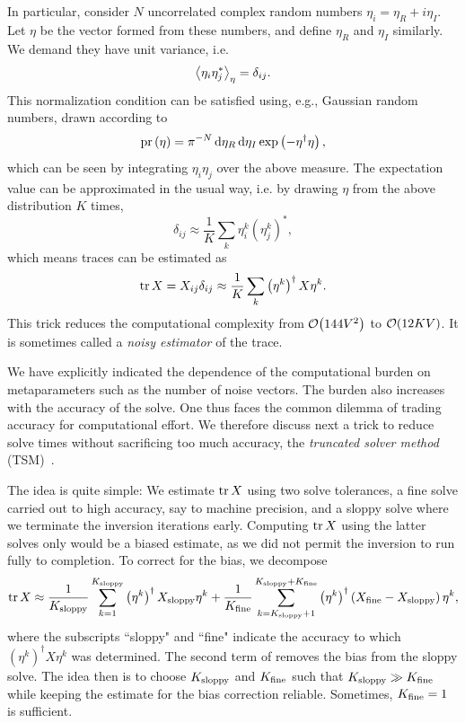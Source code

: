 In particular, consider $N$ uncorrelated complex random numbers
$\eta_i=\eta_R+i\eta_I$. Let $\eta$ be the vector formed from these numbers, and
define $\eta_R$ and $\eta_I$ similarly. We demand they have unit variance, i.e.
\begin{equation}\label{eq:noisenorm}
\ev{\eta_i\eta_j^*}_\eta = \delta_{ij}.
\end{equation}
This normalization condition can be satisfied using, e.g., Gaussian random
numbers, drawn according to
\begin{equation}
\pr{\eta}=\pi^{-N}\dd{\eta_R}\dd{\eta_I}\exp\left(-\eta^\dagger\eta\right),
\end{equation}
which can be seen by integrating $\eta_i\eta_j$ over the above measure.
The expectation value  can be approximated in the usual
way, i.e. by drawing $\eta$ from the above distribution $K$ times,
\begin{equation}
\delta_{ij}\approx\frac{1}{K}\sum_k\eta_i^{k}\left(\eta_j^{k}\right)^*,
\end{equation}
which means traces can be estimated as
\begin{equation}
\tr X= X_{ij}\delta_{ij} \approx\frac{1}{K}\sum_k\left(\eta^k\right)^\dagger X\eta^{k}.
\end{equation}
This trick reduces the computational complexity from $\order{144V^2}$ to
$\order{12KV}$. It is sometimes called a {\it noisy
estimator} of the trace. 

We have explicitly indicated the dependence of the computational burden on
metaparameters such as the number of noise vectors. The burden also increases
with the accuracy of the solve. One thus faces the common dilemma of
trading accuracy for computational effort. We therefore discuss next a trick to
reduce solve times without sacrificing too much accuracy, the {\it truncated
solver method} (TSM)~\cite{bali_effective_2010}.

The idea is quite simple: We estimate $\tr X$ using two solve tolerances, a fine
solve carried out to high accuracy, say to machine precision, and a sloppy solve
where we terminate the inversion iterations early. Computing $\tr X$ using the
latter solves only would be a biased estimate, as we did not permit the
inversion to run fully to completion. To correct for the bias, we decompose
\begin{equation}\label{eq:TSM}
\tr X\approx \frac{1}{K_{\rm sloppy}}\sum_{k=1}^{K_{\rm sloppy}}
\left(\eta^k\right)^\dagger X_{\rm sloppy}\eta^{k}
+\frac{1}{K_{\rm fine}}\sum_{k=K_{\rm sloppy}+1}^{K_{\rm sloppy}+K_{\rm fine}}
\left(\eta^k\right)^\dagger 
\left(X_{\rm fine}-X_{\rm sloppy}\right)\eta^{k},
\end{equation}
where the subscripts ``sloppy" and ``fine" indicate the accuracy to which
$\left(\eta^k\right)^\dagger X\eta^{k}$ was determined. The second term of
 removes the bias from the sloppy solve. The idea then is to
choose $K_{\rm sloppy}$ and $K_{\rm fine}$ such that $K_{\rm sloppy}\gg K_{\rm
fine}$ while keeping the estimate for the bias correction reliable. 
Sometimes, $K_{\rm fine}=1$ is sufficient.

